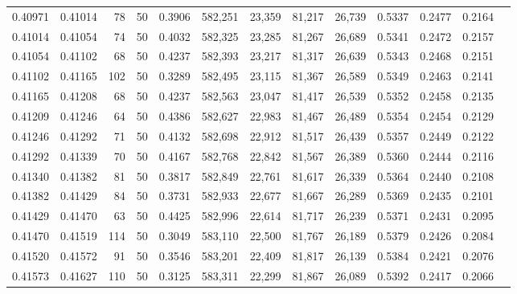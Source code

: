 \begin{tabular}{rrrrrrrrrrrrr}
0.40971 & 0.41014 &    78 &  50 &                                     0.3906 & 582,251 &  23,359 &  81,217 &  26,739 & 0.5337 & 0.2477 & 0.2164 \\
0.41014 & 0.41054 &    74 &  50 &                                     0.4032 & 582,325 &  23,285 &  81,267 &  26,689 & 0.5341 & 0.2472 & 0.2157 \\
0.41054 & 0.41102 &    68 &  50 &                                     0.4237 & 582,393 &  23,217 &  81,317 &  26,639 & 0.5343 & 0.2468 & 0.2151 \\
0.41102 & 0.41165 &   102 &  50 &                                     0.3289 & 582,495 &  23,115 &  81,367 &  26,589 & 0.5349 & 0.2463 & 0.2141 \\
0.41165 & 0.41208 &    68 &  50 &                                     0.4237 & 582,563 &  23,047 &  81,417 &  26,539 & 0.5352 & 0.2458 & 0.2135 \\
0.41209 & 0.41246 &    64 &  50 &                                     0.4386 & 582,627 &  22,983 &  81,467 &  26,489 & 0.5354 & 0.2454 & 0.2129 \\
0.41246 & 0.41292 &    71 &  50 &                                     0.4132 & 582,698 &  22,912 &  81,517 &  26,439 & 0.5357 & 0.2449 & 0.2122 \\
0.41292 & 0.41339 &    70 &  50 &                                     0.4167 & 582,768 &  22,842 &  81,567 &  26,389 & 0.5360 & 0.2444 & 0.2116 \\
0.41340 & 0.41382 &    81 &  50 &                                     0.3817 & 582,849 &  22,761 &  81,617 &  26,339 & 0.5364 & 0.2440 & 0.2108 \\
0.41382 & 0.41429 &    84 &  50 &                                     0.3731 & 582,933 &  22,677 &  81,667 &  26,289 & 0.5369 & 0.2435 & 0.2101 \\
0.41429 & 0.41470 &    63 &  50 &                                     0.4425 & 582,996 &  22,614 &  81,717 &  26,239 & 0.5371 & 0.2431 & 0.2095 \\
0.41470 & 0.41519 &   114 &  50 &                                     0.3049 & 583,110 &  22,500 &  81,767 &  26,189 & 0.5379 & 0.2426 & 0.2084 \\
0.41520 & 0.41572 &    91 &  50 &                                     0.3546 & 583,201 &  22,409 &  81,817 &  26,139 & 0.5384 & 0.2421 & 0.2076 \\
0.41573 & 0.41627 &   110 &  50 &                                     0.3125 & 583,311 &  22,299 &  81,867 &  26,089 & 0.5392 & 0.2417 & 0.2066 \\

\end{tabular}
